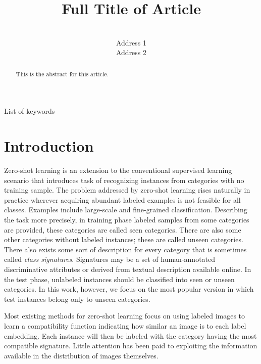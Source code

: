 \documentclass[wcp]{jmlr}
\title[Short Title]{Full Title of Article}
\author{\Name{Author Name1} \Email{abc@sample.com}\\
  \addr Address 1
  \AND
  \Name{Author Name2} \Email{xyz@sample.com}\\
  \addr Address 2
 }
\begin{document}
\maketitle

\begin{abstract}
This is the abstract for this article.
\end{abstract}
\begin{keywords}
List of keywords
\end{keywords}

\section{Introduction}
Zero-shot learning is an extension to the conventional supervised learning scenario
that introduces task of recognizing instances from categories with no training sample.
 The problem addressed by zero-shot learning rises naturally in practice wherever acquiring abundant labeled examples is not feasible for all classes. Examples include large-scale and fine-grained classification.
Describing the task more precisely, in training phase labeled samples from some categories are provided,
these categories are called seen categories. There are also some other categories without labeled instances; these are called unseen categories.
There also exists some sort of description for every category that is sometimes called \textit{class signatures}.
Signatures may be a set of human-annotated discriminative attributes or derived from textual description available online.
In the test phase, unlabeled instances should be classified into seen or unseen categories. In this work, however, we focus on the most popular version
in which test instances belong only to unseen categories.

Most existing methods for zero-shot learning focus on using labeled images to learn a compatibility function indicating how similar an image is
to each label embedding. Each instance will then be labeled with the category having the most compatible signature. Little attention
has been paid to exploiting the information available in the distribution of images themselves.
\end{document}
